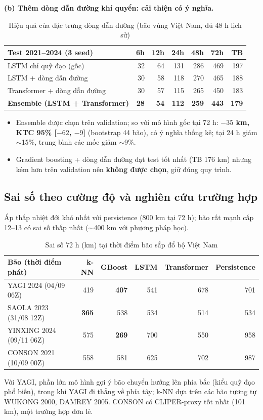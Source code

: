 \documentclass[12pt,a4paper]{article}
\begin{document}
\textbf{(b) Thêm dòng dẫn đường khí quyển: cải thiện có ý nghĩa.}
\begin{table}[H]\centering\small
\begin{tabular}{lrrrrrr}
\toprule
Test 2021--2024 (3 seed) & 6h & 12h & 24h & 48h & 72h & TB \\
\midrule
LSTM chỉ quỹ đạo (gốc) & 32 & 64 & 131 & 286 & 469 & 197 \\
LSTM + dòng dẫn đường & 30 & 58 & 118 & 270 & 465 & 188 \\
Transformer + dòng dẫn đường & 30 & 57 & 115 & 265 & 450 & 183 \\
\textbf{Ensemble (LSTM + Transformer)} & \textbf{28} & \textbf{54} & \textbf{112} & \textbf{259} & \textbf{443} & \textbf{179} \\
\bottomrule
\end{tabular}
\caption{Hiệu quả của đặc trưng dòng dẫn đường (bão vùng Việt Nam, đủ 48 h lịch sử)}
\end{table}
\begin{itemize}
  \item Ensemble được chọn trên validation; so với mô hình gốc tại 72 h:
        \textbf{$-35$ km, KTC 95\% [$-62$, $-9$]} (bootstrap 44 bão), có ý nghĩa thống kê;
        tại 24 h giảm $\sim$15\%, trung bình các mốc giảm $\sim$9\%.
  \item Gradient boosting + dòng dẫn đường đạt test tốt nhất (TB 176 km) nhưng kém
        hơn trên validation nên \textbf{không được chọn}, giữ đúng quy trình.
\end{itemize}

\subsection{Sai số theo cường độ và nghiên cứu trường hợp}
Áp thấp nhiệt đới khó nhất với persistence (800 km tại 72 h); bão rất mạnh cấp
12--13 có sai số thấp nhất ($\sim$400 km với phương pháp học).

\begin{table}[H]\centering\small
\begin{tabular}{lrrrrr}
\toprule
Bão (thời điểm phát) & k-NN & GBoost & LSTM & Transformer & Persistence \\
\midrule
YAGI 2024 (04/09 06Z) & 419 & \textbf{407} & 541 & 678 & 701 \\
SAOLA 2023 (31/08 12Z) & \textbf{365} & 538 & 534 & 514 & 534 \\
YINXING 2024 (09/11 06Z) & 575 & \textbf{269} & 700 & 550 & 958 \\
CONSON 2021 (10/09 00Z) & 558 & 581 & 625 & 702 & 987 \\
\bottomrule
\end{tabular}
\caption{Sai số 72 h (km) tại thời điểm bão sắp đổ bộ Việt Nam}
\end{table}
Với YAGI, phần lớn mô hình gợi ý bão chuyển hướng lên phía bắc (kiểu quỹ đạo phổ
biến), trong khi YAGI đi thẳng về phía tây; k-NN dựa trên các bão tương tự WUKONG
2000, DAMREY 2005. CONSON có CLIPER-proxy tốt nhất (101 km), một trường hợp đơn lẻ.
\end{document}
